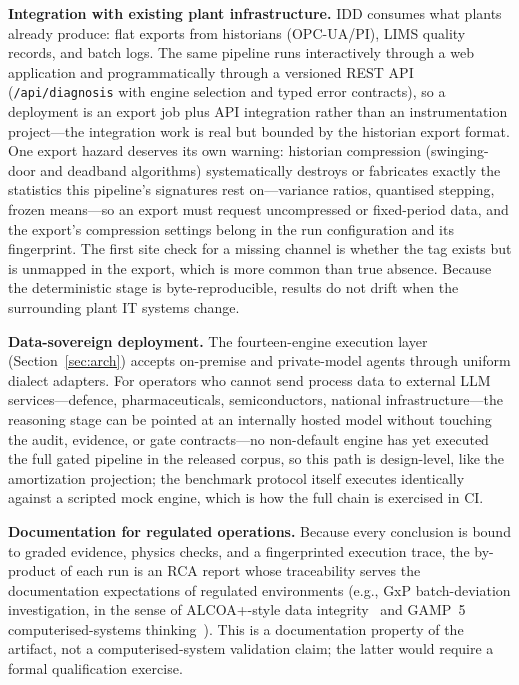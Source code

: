\documentclass[preprint,10pt]{elsarticle}
\begin{document}
\textbf{Integration with existing plant infrastructure.} IDD consumes what plants already produce: flat exports from historians (OPC-UA/PI), LIMS quality records, and batch logs. The same pipeline runs interactively through a web application and programmatically through a versioned REST API (\texttt{/api/diagnosis} with engine selection and typed error contracts), so a deployment is an export job plus API integration rather than an instrumentation project---the integration work is real but bounded by the historian export format. One export hazard deserves its own warning: historian compression (swinging-door and deadband algorithms) systematically destroys or fabricates exactly the statistics this pipeline's signatures rest on---variance ratios, quantised stepping, frozen means---so an export must request uncompressed or fixed-period data, and the export's compression settings belong in the run configuration and its fingerprint. The first site check for a missing channel is whether the tag exists but is unmapped in the export, which is more common than true absence. Because the deterministic stage is byte-reproducible, results do not drift when the surrounding plant IT systems change.

\textbf{Data-sovereign deployment.} The fourteen-engine execution layer (Section~\ref{sec:arch}) accepts on-premise and private-model agents through uniform dialect adapters. For operators who cannot send process data to external LLM services---defence, pharmaceuticals, semiconductors, national infrastructure---the reasoning stage can be pointed at an internally hosted model without touching the audit, evidence, or gate contracts---no non-default engine has yet executed the full gated pipeline in the released corpus, so this path is design-level, like the amortization projection; the benchmark protocol itself executes identically against a scripted mock engine, which is how the full chain is exercised in CI.

\textbf{Documentation for regulated operations.} Because every conclusion is bound to graded evidence, physics checks, and a fingerprinted execution trace, the by-product of each run is an RCA report whose traceability serves the documentation expectations of regulated environments (e.g., GxP batch-deviation investigation, in the sense of ALCOA+-style data integrity~\cite{mhra2018} and GAMP~5 computerised-systems thinking~\cite{gamp2022}). This is a documentation property of the artifact, not a computerised-system validation claim; the latter would require a formal qualification exercise.
\end{document}
